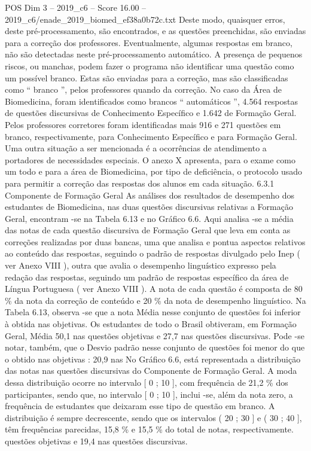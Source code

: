 \begin{textsample}{POS Dim 3 – 2019\_c6 – Score 16.00 – 2019\_c6/enade\_2019\_biomed\_ef38a0b72c.txt}
Deste modo, quaisquer erros, deste pré-processamento, são encontrados, e as questões preenchidas, são enviadas para a correção dos professores.
Eventualmente, algumas respostas em branco, não são detectadas neste pré-processamento automático.
A presença de pequenos riscos, ou manchas, podem fazer o programa não identificar uma questão como um possível branco.
Estas são enviadas para a correção, mas são classificadas como “ branco ”, pelos professores quando da correção.
No caso da Área de Biomedicina, foram identificados como brancos “ automáticos ”, 4.564 respostas de questões discursivas de Conhecimento Específico e 1.642 de Formação Geral.
Pelos professores corretores foram identificadas mais 916 e 271 questões em branco, respectivamente, para Conhecimento Específico e para Formação Geral.
Uma outra situação a ser mencionada é a ocorrências de atendimento a portadores de necessidades especiais.
O anexo X apresenta, para o exame como um todo e para a área de Biomedicina, por tipo de deficiência, o protocolo usado para permitir a correção das respostas dos alunos em cada situação. 6.3.1 Componente de Formação Geral As análises dos resultados de desempenho dos estudantes de Biomedicina, nas duas questões discursivas relativas a Formação Geral, encontram -se na Tabela 6.13 e no Gráfico 6.6.
Aqui analisa -se a média das notas de cada questão discursiva de Formação Geral que leva em conta as correções realizadas por duas bancas, uma que analisa e pontua aspectos relativos ao conteúdo das respostas, seguindo o padrão de respostas divulgado pelo Inep ( ver Anexo VIII ), outra que avalia o desempenho linguístico expresso pela redação das respostas, seguindo um padrão de respostas específico da área de Língua Portuguesa ( ver Anexo VIII ).
A nota de cada questão é composta de 80 \% da nota da correção de conteúdo e 20 \% da nota de desempenho linguístico.
Na Tabela 6.13, observa -se que a nota Média nesse conjunto de questões foi inferior à obtida nas objetivas.
Os estudantes de todo o Brasil obtiveram, em Formação Geral, Média 50,1 nas questões objetivas e 27,7 nas questões discursivas.
Pode -se notar, também, que o Desvio padrão nesse conjunto de questões foi menor do que o obtido nas objetivas : 20,9 nas No Gráfico 6.6, está representada a distribuição das notas nas questões discursivas do Componente de Formação Geral.
A moda dessa distribuição ocorre no intervalo [ 0 ; 10 ], com frequência de 21,2 \% dos participantes, sendo que, no intervalo [ 0 ; 10 ], inclui -se, além da nota zero, a frequência de estudantes que deixaram esse tipo de questão em branco.
A distribuição é sempre decrescente, sendo que os intervalos ( 20 ; 30 ] e ( 30 ; 40 ], têm frequências parecidas, 15,8 \% e 15,5 \% do total de notas, respectivamente. questões objetivas e 19,4 nas questões discursivas.

\end{textsample}
